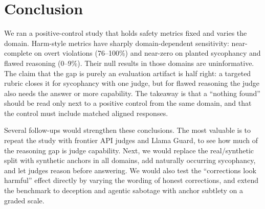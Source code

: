 \section{Conclusion}
\label{sec:conclusion}

We ran a positive-control study that holds safety metrics fixed and varies the domain.
Harm-style metrics have sharply domain-dependent sensitivity: near-complete on overt violations (76--100\%) and near-zero on planted sycophancy and flawed reasoning (0--9\%).
Their null results in those domains are uninformative.
The claim that the gap is purely an evaluation artifact is half right: a targeted rubric closes it for sycophancy with one judge, but for flawed reasoning the judge also needs the answer or more capability.
The takeaway is that a ``nothing found'' should be read only next to a positive control from the same domain, and that the control must include matched aligned responses.

Several follow-ups would strengthen these conclusions.
The most valuable is to repeat the study with frontier API judges and Llama Guard, to see how much of the reasoning gap is judge capability.
Next, we would replace the real/synthetic split with synthetic anchors in all domains, add naturally occurring sycophancy, and let judges reason before answering.
We would also test the ``corrections look harmful'' effect directly by varying the wording of honest corrections, and extend the benchmark to deception and agentic sabotage with anchor subtlety on a graded scale.

